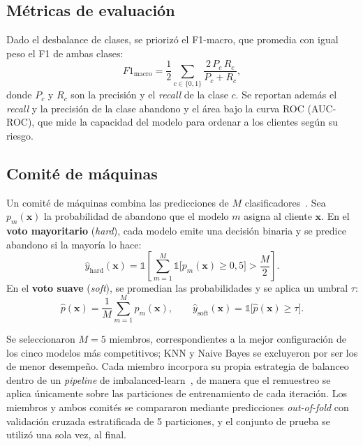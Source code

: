 \documentclass[conference]{IEEEtran}
\begin{document}
\subsection{Métricas de evaluación}

Dado el desbalance de clases, se priorizó el F1-macro, que promedia con igual peso el F1 de ambas clases:
\begin{equation}
F1_{\text{macro}} = \frac{1}{2}\sum_{c\in\{0,1\}} \frac{2\,P_c\,R_c}{P_c+R_c},
\end{equation}
donde $P_c$ y $R_c$ son la precisión y el \emph{recall} de la clase $c$. Se reportan además el \emph{recall} y la precisión de la clase abandono y el área bajo la curva ROC (AUC-ROC), que mide la capacidad del modelo para ordenar a los clientes según su riesgo.

\subsection{Comité de máquinas}

Un comité de máquinas combina las predicciones de $M$ clasificadores~\cite{kuncheva2014combining}. Sea $p_m(\mathbf{x})$ la probabilidad de abandono que el modelo $m$ asigna al cliente $\mathbf{x}$. En el \textbf{voto mayoritario} (\emph{hard}), cada modelo emite una decisión binaria y se predice abandono si la mayoría lo hace:
\begin{equation}
\hat{y}_{\text{hard}}(\mathbf{x}) = \mathbb{1}\!\left[\sum_{m=1}^{M} \mathbb{1}\big[p_m(\mathbf{x})\geq 0{,}5\big] > \frac{M}{2}\right].
\end{equation}
En el \textbf{voto suave} (\emph{soft}), se promedian las probabilidades y se aplica un umbral $\tau$:
\begin{equation}
\hat{p}(\mathbf{x}) = \frac{1}{M}\sum_{m=1}^{M} p_m(\mathbf{x}), \qquad \hat{y}_{\text{soft}}(\mathbf{x}) = \mathbb{1}\big[\hat{p}(\mathbf{x})\geq \tau\big].
\end{equation}

Se seleccionaron $M=5$ miembros, correspondientes a la mejor configuración de los cinco modelos más competitivos; KNN y Naive Bayes se excluyeron por ser los de menor desempeño. Cada miembro incorpora su propia estrategia de balanceo dentro de un \emph{pipeline} de imbalanced-learn~\cite{lemaitre2017imblearn}, de manera que el remuestreo se aplica únicamente sobre las particiones de entrenamiento de cada iteración. Los miembros y ambos comités se compararon mediante predicciones \emph{out-of-fold} con validación cruzada estratificada de 5 particiones, y el conjunto de prueba se utilizó una sola vez, al final.
\end{document}
